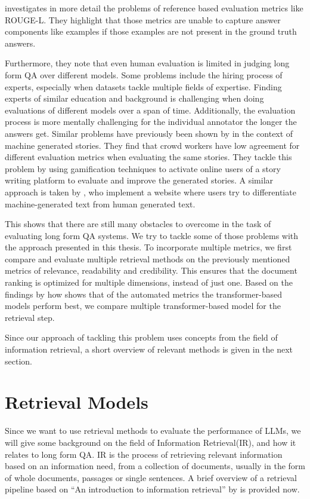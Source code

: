 \cite{krishna:2021:Hurdles} investigates in more detail the problems of reference based evaluation metrics like ROUGE-L. 
They highlight that those metrics are unable to capture answer components like examples if those examples are not present in the ground truth answers. 

Furthermore, they note that even human evaluation is limited in judging long form QA over different models.
Some problems include the hiring process of experts, especially when datasets tackle multiple fields of expertise.
Finding experts of similar education and background is challenging when doing evaluations of different models over a span of time.
Additionally, the evaluation process is more mentally challenging for the individual annotator the longer the answers get.
Similar problems have previously been shown by \cite{akoury:2020:Storium} in the context of machine generated stories.
They find that crowd workers have low agreement for different evaluation metrics when evaluating the same stories.
They tackle this problem by using gamification techniques to activate online users of a story writing platform to evaluate and improve the generated stories.
A similar approach is taken by \cite{dugan:2020:RoFT}, who implement a website where users try to differentiate machine-generated text from human generated text.

This shows that there are still many obstacles to overcome in the task of evaluating long form QA systems.
We try to tackle some of those problems with the approach presented in this thesis.
To incorporate multiple metrics, we first compare and evaluate multiple retrieval methods on the previously mentioned metrics of relevance, readability and credibility.
This ensures that the document ranking is optimized for multiple dimensions, instead of just one.
Based on the findings by \cite{xu:2023:A} how shows that of the automated metrics the transformer-based models perform best, we compare multiple transformer-based model for the retrieval step.

Since our approach of tackling this problem uses concepts from the field of information retrieval, a short overview of relevant methods is given in the next section.

\section{Retrieval Models}\label{sec:retrieval-models}
Since we want to use retrieval methods to evaluate the performance of LLMs, we will give some background on the field of Information Retrieval(IR), and how it relates to long form QA.
IR is the process of retrieving relevant information based on an information need, from a collection of documents, usually in the form of whole documents, passages or single sentences.
A brief overview of a retrieval pipeline based on ``An introduction to information retrieval'' by \cite{manning:2009:An} is provided now.

